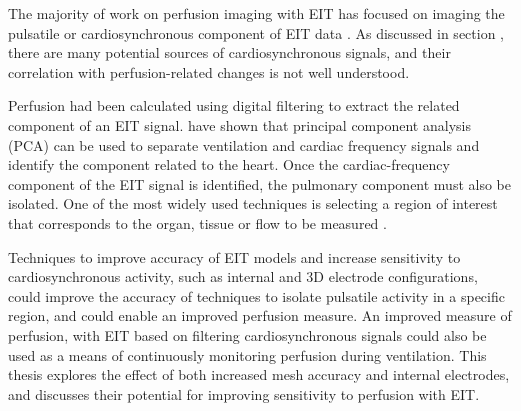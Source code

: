 The majority of work on perfusion imaging with EIT has focused on imaging the pulsatile or 
cardiosynchronous component of EIT data \parencite{nguyen_review_2012}. 
As discussed in section , there are many potential sources of 
cardiosynchronous signals, and their correlation with 
perfusion-related changes is not well understood. 

Perfusion had been calculated using digital filtering to extract the related component
of an EIT signal. 
 have shown that principal component analysis (PCA) 
can be used to separate ventilation and cardiac frequency signals and identify the component 
related to the heart. Once the cardiac-frequency component of the 
EIT signal is identified, the pulmonary component must also be isolated. 
One of the most widely used techniques 
is selecting a region of interest that corresponds 
to the organ, tissue or flow to be measured
\parencite{braun_accuracy_2018,sola_non-invasive_2011}.

Techniques to improve accuracy of EIT models and increase sensitivity 
to cardiosynchronous activity,
such as internal and 3D electrode configurations, could improve 
the accuracy of techniques to isolate pulsatile
activity in a specific region, and could enable an 
improved perfusion measure. 
An improved measure of perfusion, with EIT based on filtering 
cardiosynchronous signals could also be used as 
a means of continuously monitoring perfusion during ventilation.
This thesis explores the effect of both increased mesh accuracy and internal electrodes,
and discusses their potential for improving sensitivity to perfusion with EIT.
























